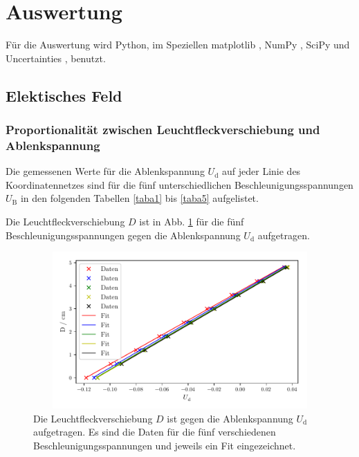 \section{Auswertung}
\label{sec:Auswertung}

Für die Auswertung wird Python, im Speziellen matplotlib \cite{matplotlib},
NumPy \cite{numpy}, SciPy \cite{scipy} und Uncertainties
\cite{uncertainties}, benutzt.

\subsection{Elektisches Feld}
\subsubsection{Proportionalität zwischen Leuchtfleckverschiebung und Ablenkspannung}
\label{sec:prop}
Die gemessenen Werte für die Ablenkspannung $U_\text{d}$
auf jeder Linie des Koordinatennetzes sind für die fünf
unterschiedlichen Beschleunigungsspannungen $U_\text{B}$
in den folgenden Tabellen \ref{taba1} bis \ref{taba5} aufgelistet.






\noindent Die Leuchtfleckverschiebung $D$ ist in Abb. \ref{fig:plot1}
für die fünf Beschleunigungsspannungen gegen die 
Ablenkspannung $U_\text{d}$ aufgetragen.
\begin{figure}
    \centering
    \includegraphics[width=12cm, height=6cm]{build/plot1.pdf}
    \caption{Die Leuchtfleckverschiebung $D$ ist gegen die
    Ablenkspannung $U_\text{d}$ aufgetragen. Es sind die Daten
    für die fünf verschiedenen Beschleunigungsspannungen und
    jeweils ein Fit eingezeichnet.}
    \label{fig:plot1}
\end{figure}

